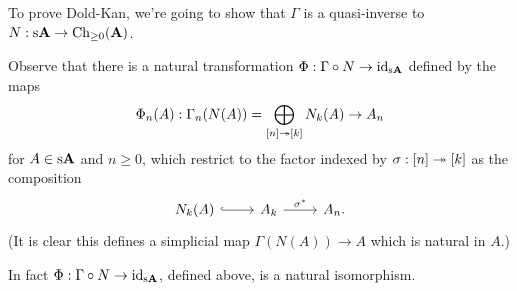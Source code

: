 To prove Dold-Kan, we're going to show that $\Gamma$ is a
quasi-inverse to $N : \mathrm{s}\mathbf{A} \to \mathrm{Ch}_{\ge 0}(\mathbf{A})$.

\begin{definition}
  Observe that there is
  a natural transformation $\Phi : \Gamma \circ N \to \operatorname{id}_{\mathrm{s}\mathbf{A}}$
  defined by the maps
  \[
  \Phi_n(A) : \Gamma_n(N(A)) = \bigoplus_{[n] \twoheadrightarrow [k]} N_k(A) \to A_n
  \]
  for $A \in \mathrm{s}\mathbf{A}$ and $n \ge 0$, which restrict to the factor indexed
  by $\sigma : [n] \twoheadrightarrow [k]$ as the composition
  \[
  \begin{tikzcd}
    N_k(A) \ar[hookrightarrow]{r} & A_k \rar{\sigma^*} & A_n.
  \end{tikzcd}
  \]
  (It is clear this defines a simplicial map $\Gamma(N(A)) \to A$ which
  is natural in $A$.)
\end{definition}

\begin{lemma}
  \label{gamma-n}
  In fact $\Phi : \Gamma \circ N \to \operatorname{id}_{\mathrm{s}\mathbf{A}}$, defined above, is a
  natural isomorphism.
\end{lemma}

